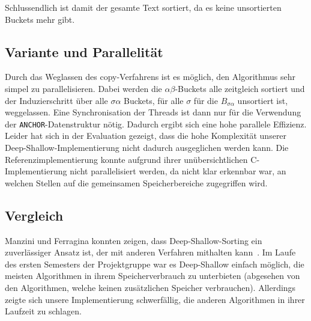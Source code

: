 Schlussendlich ist damit der gesamte Text sortiert, da es keine unsortierten Buckets mehr gibt.


\subsection{Variante und Parallelität}
Durch das Weglassen des copy-Verfahrens ist es möglich, den Algorithmus sehr simpel zu parallelisieren.
Dabei werden die $\alpha\beta$-Buckets alle zeitgleich sortiert und
der Induzierschritt über alle $\sigma\alpha$ Buckets, für alle $\sigma$ für die $B_{\sigma\alpha}$ unsortiert ist, weggelassen.
Eine Synchronisation der Threads ist dann nur für die Verwendung der \texttt{ANCHOR}-Datenstruktur nötig.
Dadurch ergibt sich eine hohe parallele Effizienz.
Leider hat sich in der Evaluation gezeigt, dass die hohe Komplexität unserer
Deep-Shallow-Implementierung nicht dadurch ausgeglichen werden kann.
Die Referenzimplementierung konnte aufgrund ihrer unübersichtlichen C-Implementierung nicht parallelisiert werden,
da nicht klar erkennbar war, an welchen Stellen auf die gemeinsamen Speicherbereiche zugegriffen wird.

\subsection{Vergleich}
Manzini und Ferragina konnten zeigen, dass Deep-Shallow-Sorting ein zuverlässiger Ansatz ist, der mit anderen Verfahren mithalten kann~\cite{saca:4}.
Im Laufe des ersten Semesters der Projektgruppe war es Deep-Shallow einfach möglich,
die meisten Algorithmen in ihrem Speicherverbrauch zu unterbieten (abgesehen von den Algorithmen, welche keinen zusätzlichen Speicher verbrauchen).
Allerdings zeigte sich unsere Implementierung schwerfällig, die anderen Algorithmen in ihrer Laufzeit zu schlagen.